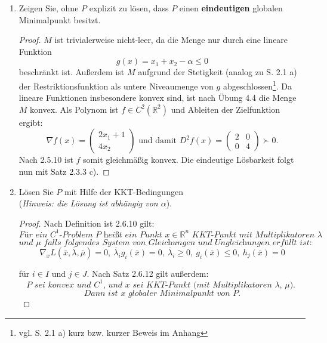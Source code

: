 \documentclass[12pt]{extreport} %
\newcommand{\R}{\mathbb{R}}
\theoremstyle{named}
\theoremstyle{nnamed}
\theoremstyle{itshape}
\theoremstyle{normal}
\begin{document}
\begin{enumerate}
	\item Zeigen Sie, ohne $P$ explizit zu lösen, dass $P$ einen \textbf{eindeutigen} globalen Minimalpunkt besitzt.
		\begin{proof}
			 $M$ ist trivialerweise nicht-leer, da die Menge nur durch eine lineare Funktion 
			 $$ g(x) = x_1+x_2-\alpha \leq 0 $$
			  beschränkt ist. Außerdem ist $M$ aufgrund der Stetigkeit (analog zu S. 2.1 a) der Restriktionsfunktion als untere Niveaumenge von $g$ abgeschlossen\footnote{vgl. S. 2.1 a) kurz bzw. kurzer Beweis im Anhang}. Da lineare Funktionen insbesondere konvex sind, ist nach Übung 4.4 die Menge $M$ konvex. Als Polynom ist $f \in C^2(\R^2)$ und Ableiten der Zielfunktion ergibt: \\
				$$ \nabla f(x) = \begin{pmatrix} 2x_1+1 \\ 4x_2 \end{pmatrix} \text{ und damit } D^2f(x) = \begin{pmatrix} 2 & 0 \\ 0 & 4 \end{pmatrix} \succ 0. $$
 			Nach 2.5.10 ist $f$ somit gleichmäßig konvex. Die eindeutige Lösbarkeit folgt nun mit Satz 2.3.3 c). 
		\end{proof}
	\item Lösen Sie $P$ mit Hilfe der KKT-Bedingungen ~\\
		(\textit{Hinweis: die Lösung ist abhängig von $\alpha$}).
		\begin{proof}
			Nach Definition ist 2.6.10 gilt:
			$$\textit{Für ein $C^1$-Problem $P$ heißt ein Punkt $x \in \R^n$ KKT-Punkt mit Multiplikatoren $\lambda$}$$
			$$\textit{und $\mu$ falls folgendes System von Gleichungen und Ungleichungen erfüllt ist:} $$
			$$ \nabla_x L(\overline{x}, \overline{\lambda}, \overline{\mu}) = 0, ~ \overline{\lambda}_i g_i(\overline{x}) = 0, ~\overline{\lambda}_i \geq 0, ~g_i(\overline{x}) \leq 0, ~ h_j(\overline{x}) = 0  $$
		
			für $i \in I$ und $j \in J$. Nach Satz 2.6.12 gilt außerdem:
			$$\textit{$P$ sei konvex und $C^1$, und $x$ sei KKT-Punkt (mit Multiplikatoren $\lambda$, $\mu$). }$$
			$$ \textit{Dann ist $x$ globaler Minimalpunkt von $P$.} $$
			

\end{proof}
\end{enumerate}
\end{document}
